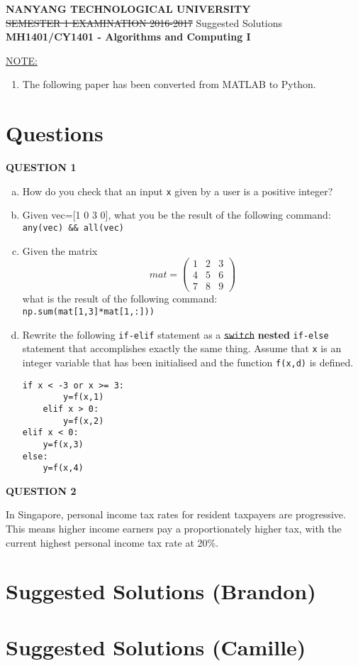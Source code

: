 \documentclass[a4paper,12pt]{article}
\begin{document}
	\begin{titlepage}
		\begin{center}
			\textbf{NANYANG TECHNOLOGICAL UNIVERSITY}\\\vspace{1em}\sout{SEMESTER 1 EXAMINATION 2016-2017} Suggested Solutions\\\vspace{1em}
			\textbf{MH1401/CY1401 - Algorithms and Computing I}
		\end{center}
				\vspace{5em}
	\underline{NOTE:}
	\begin{enumerate}
		\item The following paper has been converted from MATLAB to Python.
	\end{enumerate}
	\vfill
	\end{titlepage}


	\tableofcontents
	\newpage
\section*{Questions}
\textbf{QUESTION 1}
	\begin{enumerate}[(a)]
		\item How do you check that an input \texttt{x} given by a user is a positive integer?
		\item Given vec=[1 0 3 0], what you be the result of the following command:\\\texttt{any(vec) \&\& all(vec)}
		\item Given the matrix\begin{equation*}
		mat = \begin{pmatrix*}
		1 & 2 & 3\\4 & 5 & 6\\7 & 8 & 9
		\end{pmatrix*}
		\end{equation*}
		what is the result of the following command:\\
		\texttt{np.sum(mat[1,3]*mat[1,:]))}
		\item Rewrite the following \texttt{if-elif} statement as a \sout{\texttt{switch}} \textbf{nested} \texttt{if-else} statement that accomplishes exactly the same thing. Assume that \texttt{x} is an integer variable that has been initialised and the function \texttt{f(x,d)} is defined.\begin{verbatim}if x < -3 or x >= 3:
	    y=f(x,1)
	elif x > 0:
	    y=f(x,2)
elif x < 0:
    y=f(x,3)
else:
    y=f(x,4)
	 \end{verbatim}
		\end{enumerate}
	\textbf{QUESTION 2}\\
	{\par \noindent In Singapore, personal income tax rates for resident taxpayers are progressive. This means higher income earners pay a proportionately higher tax, with the current highest personal income tax rate at 20\%.}
	\newpage
	\section*{Suggested Solutions (Brandon)}
	\newpage
	\section*{Suggested Solutions (Camille)}
\end{document}
